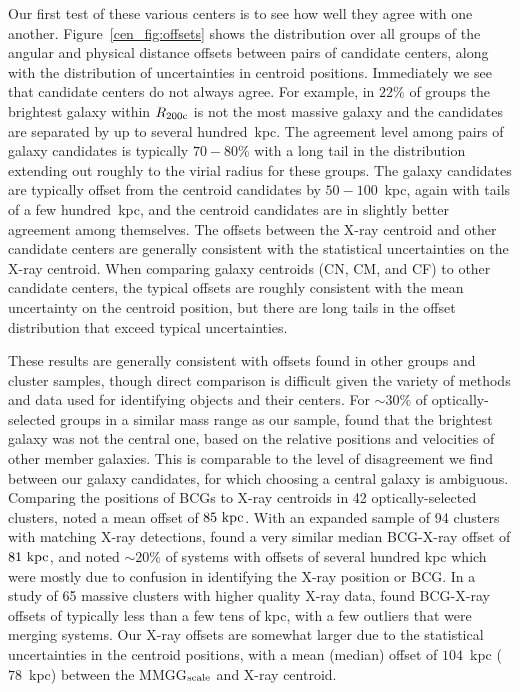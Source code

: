 Our first test of these various centers is to see how well they agree with one
another. Figure~\ref{cen_fig:offsets} shows the distribution over all
groups of the angular and physical distance offsets between pairs of
candidate centers, along with the distribution of uncertainties in
centroid positions. Immediately we see that candidate centers do not 
always agree. For example, in $22\%$ of groups the brightest galaxy
within $R_{\rm 200c}$ is not the most massive galaxy and the
candidates are separated by up to several hundred~{\rm kpc}. The
agreement level among pairs of galaxy candidates is typically
$70-80\%$ with a long tail in the distribution extending out roughly
to the virial radius for these groups. The galaxy candidates are
typically offset from the centroid candidates by $50-100$~{\rm kpc},
again with tails of a few hundred~{\rm kpc}, and the centroid
candidates are in slightly better agreement among themselves. The
offsets between the X-ray centroid and other candidate centers are
generally consistent with the statistical uncertainties on the X-ray
centroid. When comparing galaxy centroids (CN, CM, and CF) to other
candidate centers, the typical offsets are roughly consistent with the
mean uncertainty on the centroid position, but there are long tails
in the offset distribution that exceed typical uncertainties.

These results are generally consistent with offsets found in other
groups and cluster samples, though direct comparison is difficult
given the variety of methods and data used for identifying objects and
their centers. For $\sim30\%$ of optically-selected groups in a
similar mass range as our sample, \citet{Skibba2011} found that the
brightest galaxy was not the central one, based on the relative positions
and velocities of other member galaxies. This is comparable to the
level of disagreement we find between our galaxy candidates, for which
choosing a central galaxy is ambiguous. Comparing the positions of
BCGs to X-ray centroids in 42 optically-selected clusters,
\citet{Sheldon2001} noted a mean offset of $85~{\rm kpc}$. With an
expanded sample of 94 clusters with matching X-ray detections,
\citet{Koester2007b} found a very similar median BCG-X-ray offset of
$81~{\rm kpc}$, and noted $\sim20\%$ of systems with offsets of
several hundred kpc which were mostly due to confusion in identifying
the X-ray position or BCG. In a study of 65 massive clusters with
higher quality X-ray data, \citet{Sanderson2009} found BCG-X-ray
offsets of typically less than a few tens of kpc, with a few
outliers that were merging systems. Our X-ray offsets are somewhat
larger due to the statistical uncertainties in the centroid positions,
with a mean (median) offset of $104$~{\rm kpc} ($78$~{\rm kpc})
between the MMGG$_{\rm scale}$ and X-ray centroid.


